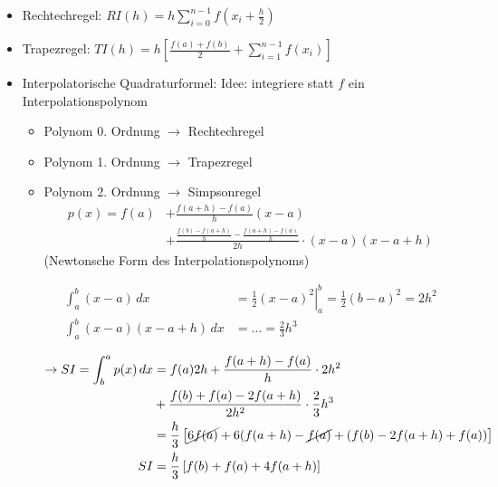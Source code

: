 \documentclass[a4paper,ngerman]{scrbook}
\begin{document}
\begin{itemize}
\item Rechtechregel: $RI(h) = h\sum\limits_{i=0}^{n-1}   f\left(x_i+\frac{h}{2}\right)$

\item Trapezregel: $TI(h) = h\left[\frac{f(a) + f(b)}{2} + \sum\limits_{i=1}^{n-1} f(x_i)\right]$
\item Interpolatorische Quadraturformel: Idee: integriere statt $f$ ein Interpolationspolynom
\begin{itemize}
\item Polynom 0. Ordnung $\to$ Rechtechregel
\item Polynom 1. Ordnung $\to$ Trapezregel
\item Polynom 2. Ordnung $\to$ Simpsonregel
  \begin{align*}
    p(x) = f(a) &+ \frac{f(a + h) - f(a)}{h}(x-a)\\
    &+ \frac{\frac{f(b) - f(a+h)}{h} - \frac{f(a+h)-f(a)}{h}}{2h}\cdot(x-a)(x-a+h)
  \end{align*}
(Newtonsche Form des Interpolationspolynoms)


\begin{align*}
  \int_a^b (x-a)\, dx &= \left.\frac{1}{2} (x-a)^2 \right|_a^b =   \frac{1}{2} (b-a)^2 = 2h^2\\
\int_a^b (x-a)(x-a+h)\, dx &= \dots = \frac{2}{3}h^3\\
\end{align*}
\begin{align*}
  \to SI = \int_b^a p(x)\, dx &= f(a)2h + \frac{f(a+h) -f(a)}{h}\cdot   2h^2\\
&+ \frac{f(b)+f(a)-2f(a+h)}{2h^2}\cdot\frac{2}{3}h^3\\
&= \frac{h}{3}\left[ \cancel{6f(a)} + 6(f(a+h) - \cancel{f(a)} + (f(b) - 2f(a+h)+f(a)) \right]\\
SI &= \frac{h}{3}\left[ f(b) + f(a) + 4f(a+h) \right]
\end{align*}
\end{itemize}

\end{itemize}
\end{document}
